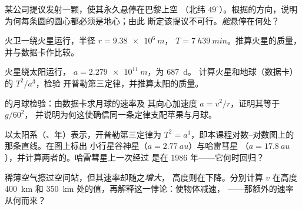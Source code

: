 \begin{exercise}[$\star\star$]\label{exo:g12:satellites-kepler:7}
某公司提议发射一颗，使其永久悬停在巴黎上空
（北纬 $49^\circ$）。根据的方向，说明
为何每条圆的圆心都必须是地心；由此
断定该提议不可行。\emph{能}悬停在何处？
\end{exercise}

\begin{exercise}[$\star\star$]\label{exo:g12:satellites-kepler:8}
火卫一绕火星运行，半径 $r = \qty{9.38e6}{m}$， $T = \qty{7}{h}
\qty{39}{min}$。推算火星的质量，并与数据卡作比较。
\end{exercise}

\begin{exercise}[$\star\star$]\label{exo:g12:satellites-kepler:9}
火星绕太阳运行， $a = \qty{2.279e11}{m}$，为 \qty{687}{d}。
计算火星和地球（数据卡）的 $T^2/a^3$，检验
开普勒第三定律，并推算太阳的质量。
\end{exercise}

\begin{exercise}[$\star\star$]\label{exo:g12:satellites-kepler:10}
的月球检验：由数据卡求月球的速率及
其向心加速度 $a = v^2/r$，证明其等于 $g/60^2$，
并说明为何这使确信同一条定律支配苹果与月球。
\end{exercise}

\begin{exercise}[$\star\star$]\label{exo:g12:satellites-kepler:11}
以太阳系（、年）表示，开普勒第三定律为
$T^2 = a^3$，即本课程对数–对数图上的那条直线。在图上标出
小行星谷神星（$a = \qty{2.77}{au}$）与哈雷彗星
（$a = \qty{17.8}{au}$），并计算两者的。哈雷彗星上一次经过
是在 1986 年——它何时回归？
\end{exercise}

\begin{exercise}[$\star\star\star$]\label{exo:g12:satellites-kepler:12}
稀薄空气擦过空间站，但其速率却随之\emph{增大}，
高度则在下降。分别计算 $v$ 在高度 \qty{400}{km} 和
\qty{350}{km} 处的值，再解释这一悖论：使物体减速，
——那额外的速率从何而来？
\end{exercise}

